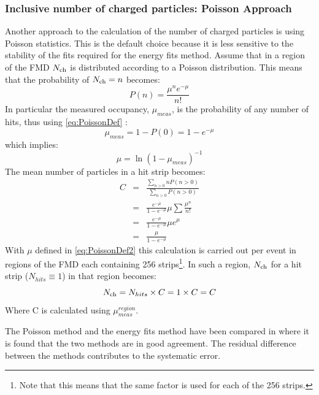 \documentclass[11pt]{article}
\begin{document}
\subsubsection{Inclusive number of charged particles: Poisson Approach} 
\label{sec:sub:sub:poisson}
Another approach to the calculation of the number of charged particles
is using Poisson statistics. This is the default choice because it is
less sensitive to the stability of the fits required for the energy
fits method. 
Assume that in a region of the FMD %
$N_{\text{ch}}$ 
is
distributed according to a Poisson distribution. This means that the
probability of $N_{\text{ch}}=n$ becomes:
\begin{equation}
P(n) = \frac{\mu^n e^{-\mu}}{n!} \label{eq:PoissonDef}
\end{equation}
In particular the measured occupancy, $\mu_{meas}$, is the probability
of any number of hits, thus using \eqref{eq:PoissonDef} :
\begin{equation}
\mu_{meas} = 1 - P(0) = 1 - e^{-\mu } 
\end{equation}
which implies:
\begin{equation}
\mu = \ln
(1 - \mu_{meas})^{-1} \label{eq:PoissonDef2}
\end{equation}
The mean number of particles in a hit strip becomes:
\begin{eqnarray}
C &=& \frac{\sum_{n>0} n P(n>0)}{\sum_{n>0} P(n>0)} \nonumber \\
  &=& \frac{e^{-\mu}}{1-e^{-\mu}} \mu  \sum \frac{\mu^n}{n!} 
  \nonumber \\
  &=& \frac{e^{-\mu}}{1-e^{-\mu}} \mu e^{\mu} \nonumber \\
  &=& \frac{\mu}{1-e^{-\mu}}
\end{eqnarray}
With $\mu$ defined in \eqref{eq:PoissonDef2} this calculation is
carried out per event in
regions of the FMD each containing 256 strips\footnote{Note that this means that the same factor is used for each of the 256 strips.}. %
 In such a region,
$N_{\text{ch}}$ for a hit strip ($N_{hits} \equiv 1$) in that region becomes:
\begin{equation}
N_{\text{ch}} = N_{hits} \times C = 1 \times C = C
\end{equation}
Where C is calculated using $\mu_{meas}^{region}$.

The Poisson method and the energy fits method have been compared in
\cite{hhd:2009} where it is found that the two methods are in good
agreement. The residual difference between the methods contributes to
the systematic error.
\end{document}

